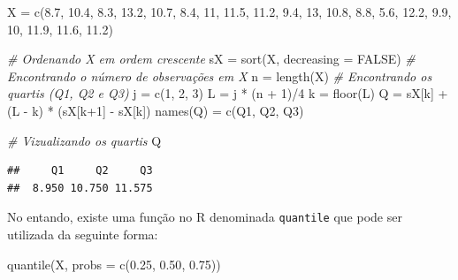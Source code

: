 \documentclass[
]{book}
\newenvironment{Shaded}{\begin{snugshade}}{\end{snugshade}}
\newcommand{\AttributeTok}[1]{\textcolor[rgb]{0.77,0.63,0.00}{#1}}
\newcommand{\CommentTok}[1]{\textcolor[rgb]{0.56,0.35,0.01}{\textit{#1}}}
\newcommand{\ConstantTok}[1]{\textcolor[rgb]{0.00,0.00,0.00}{#1}}
\newcommand{\DecValTok}[1]{\textcolor[rgb]{0.00,0.00,0.81}{#1}}
\newcommand{\FloatTok}[1]{\textcolor[rgb]{0.00,0.00,0.81}{#1}}
\newcommand{\FunctionTok}[1]{\textcolor[rgb]{0.00,0.00,0.00}{#1}}
\newcommand{\NormalTok}[1]{#1}
\newcommand{\OtherTok}[1]{\textcolor[rgb]{0.56,0.35,0.01}{#1}}
\newcommand{\SpecialCharTok}[1]{\textcolor[rgb]{0.00,0.00,0.00}{#1}}
\newcommand{\StringTok}[1]{\textcolor[rgb]{0.31,0.60,0.02}{#1}}
\begin{document}
\begin{Shaded}
\begin{Highlighting}[]
\NormalTok{X }\OtherTok{=} \FunctionTok{c}\NormalTok{(}\FloatTok{8.7}\NormalTok{, }\FloatTok{10.4}\NormalTok{, }\FloatTok{8.3}\NormalTok{, }\FloatTok{13.2}\NormalTok{, }\FloatTok{10.7}\NormalTok{, }\FloatTok{8.4}\NormalTok{, }\DecValTok{11}\NormalTok{, }\FloatTok{11.5}\NormalTok{, }\FloatTok{11.2}\NormalTok{, }\FloatTok{9.4}\NormalTok{, }
      \DecValTok{13}\NormalTok{, }\FloatTok{10.8}\NormalTok{, }\FloatTok{8.8}\NormalTok{, }\FloatTok{5.6}\NormalTok{, }\FloatTok{12.2}\NormalTok{, }\FloatTok{9.9}\NormalTok{, }\DecValTok{10}\NormalTok{, }\FloatTok{11.9}\NormalTok{, }\FloatTok{11.6}\NormalTok{, }\FloatTok{11.2}\NormalTok{)}

\CommentTok{\# Ordenando X em ordem crescente}
\NormalTok{sX }\OtherTok{=} \FunctionTok{sort}\NormalTok{(X, }\AttributeTok{decreasing =} \ConstantTok{FALSE}\NormalTok{)}
\CommentTok{\# Encontrando o número de observações em X}
\NormalTok{n }\OtherTok{=} \FunctionTok{length}\NormalTok{(X) }
\CommentTok{\# Encontrando os quartis (Q1, Q2 e Q3)}
\NormalTok{j }\OtherTok{=} \FunctionTok{c}\NormalTok{(}\DecValTok{1}\NormalTok{, }\DecValTok{2}\NormalTok{, }\DecValTok{3}\NormalTok{)}
\NormalTok{L }\OtherTok{=}\NormalTok{ j }\SpecialCharTok{*}\NormalTok{ (n }\SpecialCharTok{+} \DecValTok{1}\NormalTok{)}\SpecialCharTok{/}\DecValTok{4}
\NormalTok{k }\OtherTok{=} \FunctionTok{floor}\NormalTok{(L)}
\NormalTok{Q }\OtherTok{=}\NormalTok{ sX[k] }\SpecialCharTok{+}\NormalTok{ (L }\SpecialCharTok{{-}}\NormalTok{ k) }\SpecialCharTok{*}\NormalTok{ (sX[k}\SpecialCharTok{+}\DecValTok{1}\NormalTok{] }\SpecialCharTok{{-}}\NormalTok{ sX[k])}
\FunctionTok{names}\NormalTok{(Q) }\OtherTok{=} \FunctionTok{c}\NormalTok{(}\StringTok{\textquotesingle{}Q1\textquotesingle{}}\NormalTok{, }\StringTok{\textquotesingle{}Q2\textquotesingle{}}\NormalTok{, }\StringTok{\textquotesingle{}Q3\textquotesingle{}}\NormalTok{)}

\CommentTok{\# Vizualizando os quartis}
\NormalTok{Q}
\end{Highlighting}
\end{Shaded}

\begin{verbatim}
##     Q1     Q2     Q3 
##  8.950 10.750 11.575
\end{verbatim}

No entando, existe uma função no R denominada \texttt{quantile} que pode ser utilizada da seguinte forma:

\begin{Shaded}
\begin{Highlighting}[]
\FunctionTok{quantile}\NormalTok{(X, }\AttributeTok{probs =} \FunctionTok{c}\NormalTok{(}\FloatTok{0.25}\NormalTok{, }\FloatTok{0.50}\NormalTok{, }\FloatTok{0.75}\NormalTok{))}
\end{Highlighting}
\end{Shaded}
\end{document}
